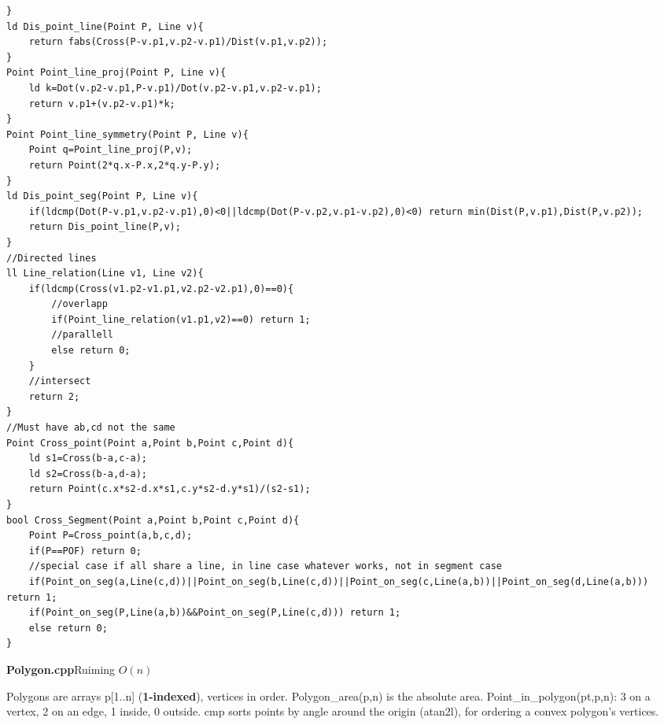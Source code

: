 \documentclass[9pt,a4paper]{extarticle}
\newcommand{\entry}[3]{%
  \addcontentsline{toc}{subsection}{#1}%
  \vspace{0.8ex}%
  \noindent\colorbox{hdbg}{\parbox{\dimexpr\columnwidth-2\fboxsep}{%
    \strut\textbf{#1}\hfill{\footnotesize\textsf{#2}}}}\par
  \vspace{0.4ex}%
  {\footnotesize #3\par}%
}
\newcommand{\code}[1]{{\ttfamily\small #1}}
\begin{document}
\begin{multicols*}{3}
\begin{lstlisting}[breaklines=true]
}
ld Dis_point_line(Point P, Line v){
    return fabs(Cross(P-v.p1,v.p2-v.p1)/Dist(v.p1,v.p2));
}
Point Point_line_proj(Point P, Line v){
    ld k=Dot(v.p2-v.p1,P-v.p1)/Dot(v.p2-v.p1,v.p2-v.p1);
    return v.p1+(v.p2-v.p1)*k;
}
Point Point_line_symmetry(Point P, Line v){
    Point q=Point_line_proj(P,v);
    return Point(2*q.x-P.x,2*q.y-P.y);
}
ld Dis_point_seg(Point P, Line v){
    if(ldcmp(Dot(P-v.p1,v.p2-v.p1),0)<0||ldcmp(Dot(P-v.p2,v.p1-v.p2),0)<0) return min(Dist(P,v.p1),Dist(P,v.p2));
    return Dis_point_line(P,v);
}
//Directed lines
ll Line_relation(Line v1, Line v2){
    if(ldcmp(Cross(v1.p2-v1.p1,v2.p2-v2.p1),0)==0){
        //overlapp
        if(Point_line_relation(v1.p1,v2)==0) return 1;
        //parallell
        else return 0;
    }
    //intersect
    return 2;
}
//Must have ab,cd not the same
Point Cross_point(Point a,Point b,Point c,Point d){
    ld s1=Cross(b-a,c-a);
    ld s2=Cross(b-a,d-a);
    return Point(c.x*s2-d.x*s1,c.y*s2-d.y*s1)/(s2-s1);
}
bool Cross_Segment(Point a,Point b,Point c,Point d){
    Point P=Cross_point(a,b,c,d);
    if(P==POF) return 0;
    //special case if all share a line, in line case whatever works, not in segment case
    if(Point_on_seg(a,Line(c,d))||Point_on_seg(b,Line(c,d))||Point_on_seg(c,Line(a,b))||Point_on_seg(d,Line(a,b))) return 1;
    if(Point_on_seg(P,Line(a,b))&&Point_on_seg(P,Line(c,d))) return 1;
    else return 0;
}
\end{lstlisting}

\entry{Polygon.cpp}{Ruiming \quad $O(n)$}{Polygons are arrays \code{p[1..n]} (\textbf{1-indexed}), vertices in order. \code{Polygon\_area(p,n)} is the absolute area. \code{Point\_in\_polygon(pt,p,n)}: 3 on a vertex, 2 on an edge, 1 inside, 0 outside. \code{cmp} sorts points by angle around the origin (\code{atan2l}), for ordering a convex polygon's vertices.}


\end{multicols*}
\end{document}
